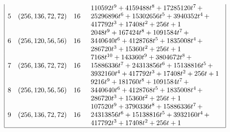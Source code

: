 \begin{table}[!bhpt]
\begin{align*}
\begin{array}{|cccl|}
5 &
(256, 136, 72, 72) &
16 &
\begin{array}{l}
110592t^{9} + 4159488t^{8} + 17285120t^{7}
\,+
\\
 25296896t^{6} + 15302656t^{5} + 3940352t^{4}
\,+
\\
 417792t^{3} + 17408t^{2} + 256t + 1
\end{array}
\\
6 &
(256, 120, 56, 56) &
16 &
\begin{array}{l}
2048t^{9} + 167424t^{8} + 1091584t^{7}
\,+
\\
 3440640t^{6} + 4128768t^{5} + 1835008t^{4}
\,+
\\
 286720t^{3} + 15360t^{2} + 256t + 1
\end{array}
\\
7 &
(256, 136, 72, 72) &
16 &
\begin{array}{l}
7168t^{10} + 143360t^{9} + 3804672t^{8}
\,+
\\
 15886336t^{7} + 24313856t^{6} + 15138816t^{5}
\,+
\\
 3932160t^{4} + 417792t^{3} + 17408t^{2} + 256t + 1
\end{array}
\\
8 &
(256, 120, 56, 56) &
16 &
\begin{array}{l}
9216t^{9} + 181760t^{8} + 1091584t^{7}
\,+
\\
 3440640t^{6} + 4128768t^{5} + 1835008t^{4}
\,+
\\
 286720t^{3} + 15360t^{2} + 256t + 1
\end{array}
\\
9 &
(256, 136, 72, 72) &
16 &
\begin{array}{l}
107520t^{9} + 3790336t^{8} + 15886336t^{7}
\,+
\\
 24313856t^{6} + 15138816t^{5} + 3932160t^{4}
\,+
\\
 417792t^{3} + 17408t^{2} + 256t + 1
\end{array}
\\
\hline
\end{array}
\end{align*}
\caption{$[f_{8,10}]$ extended Cayley classes.}
\label{tab-c8_10_EC_classes}
\end{table}


